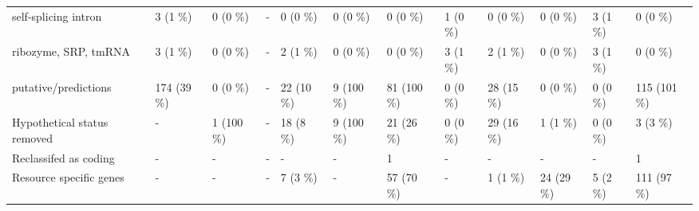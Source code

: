 {\begin{tabular}{llllllllllll}
\hspace{1em}self-splicing intron & 3 (1 \%) & 0 (0 \%) & - & 0 (0 \%) & 0 (0 \%) & 0 (0 \%) & 1 (0 \%) & 0 (0 \%) & 0 (0 \%) & 3 (1 \%) & 0 (0 \%)\\
\hspace{1em}ribozyme, SRP, tmRNA & 3 (1 \%) & 0 (0 \%) & - & 2 (1 \%) & 0 (0 \%) & 0 (0 \%) & 3 (1 \%) & 2 (1 \%) & 0 (0 \%) & 3 (1 \%) & 0 (0 \%)\\
\hspace{1em}putative/predictions & 174 (39 \%) & 0 (0 \%) & - & 22 (10 \%) & 9 (100 \%) & 81 (100 \%) & 0 (0 \%) & 28 (15 \%) & 0 (0 \%) & 0 (0 \%) & 115 (101 \%)\\
Hypothetical status removed & - & 1 (100 \%) & - & 18 (8 \%) & 9 (100 \%) & 21 (26 \%) & 0 (0 \%) & 29 (16 \%) & 1 (1 \%) & 0 (0 \%) & 3 (3 \%)\\
Reclassifed as coding & - & - & - & - & - & 1 & - & - & - & - & 1\\
Resource specific genes & - & - & - & 7 (3 \%) & - & 57 (70 \%) & - & 1 (1 \%) & 24 (29 \%) & 5 (2 \%) & 111 (97 \%)\\
\bottomrule
\end{tabular}}
